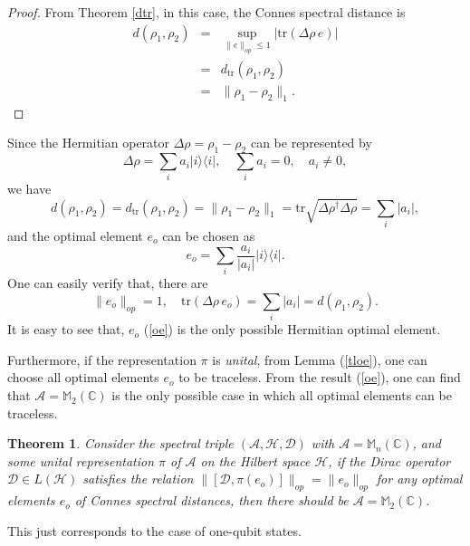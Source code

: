 \documentclass[a4paper,12pt]{article}
\newtheorem{theorem}{Theorem}
\begin{document}
\begin{proof}
From Theorem \ref{dtr}, in this case, the Connes spectral distance is
\begin{eqnarray}
  d (\rho_1, \rho_2) & = & \sup_{\|e\|_{op} \leqslant 1} | \mathrm{tr} (\Delta
  \rho \, e) | \nonumber\\
  & = & d_{\mathrm{tr}} (\rho_1, \rho_2) \nonumber\\
  & = & \| \rho_1 - \rho_2 \|_1 .
\end{eqnarray}
\end{proof}

Since the Hermitian operator $\Delta \rho = \rho_1 - \rho_2$ can be
represented by
\begin{equation}
  \Delta \rho = \sum_i a_i |i \rangle \langle i|, \quad \sum_i a_i = 0, \quad
  a_i \neq 0,
\end{equation}
we have
\begin{equation}
  d (\rho_1, \rho_2) = d_{\mathrm{tr}} (\rho_1, \rho_2) =\| \rho_1 - \rho_2 \|_1 = \mathrm{tr}
  \sqrt{\Delta \rho^{\dag} \Delta \rho} = \sum_i |a_i |,
\end{equation}
and the optimal element $e_o$ can be chosen as
\begin{equation}
  e_o = \sum_i \frac{a_i}{|a_i |} |i \rangle \langle i|. \label{oe}
\end{equation}
One can easily verify that, there are
\begin{equation}
  \|e_o \|_{op} = 1, \quad \mathrm{tr} (\Delta \rho \, e_o) =
  \sum_i |a_i |=d (\rho_1, \rho_2) .
\end{equation}
It is easy to see that, $e_o$ (\ref{oe}) is the only possible Hermitian
optimal element.


Furthermore, if the representation $\pi$ is \textit{unital}, from Lemma (\ref{tloe}),
one can choose all optimal elements $e_o$ to be traceless. From the result
(\ref{oe}), one can find that $\mathcal{A}=\mathbb{M}_2 (\mathbb{C})$ is the
only possible case in which all optimal elements can be traceless.

\begin{theorem}
  Consider the spectral triple $(\mathcal{A}, \mathcal{H}, \mathcal{D})$ with
  $\mathcal{A}=\mathbb{M}_n (\mathbb{C})$, and some unital
  representation $\pi$ of $\mathcal{A}$ on the Hilbert space $\mathcal{H}$,
  if the Dirac operator $\mathcal{D} \in L (\mathcal{H})$ satisfies the
  relation $\|[\mathcal{D}, \pi (e_o)]\|_{op} = \|e_o \|_{op}$ for any optimal
  elements $e_o$ of Connes spectral distances, then there should be
  $\mathcal{A}=\mathbb{M}_2 (\mathbb{C})$.
\end{theorem}
This just corresponds to the case of one-qubit states.
\end{document}
